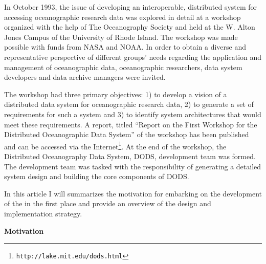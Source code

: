 In October 1993, the issue of developing an interoperable, distributed system
for accessing oceanographic research data was explored in detail at a
workshop organized with the help of The Oceanography Society and held at the
W. Alton Jones Campus of the University of Rhode Island.  The workshop was
made possible with funds from NASA and NOAA.  In order to obtain a diverse
and representative perspective of different groups' needs regarding the
application and management of oceanographic data, oceanographic researchers,
data system developers and data archive managers were invited.

The workshop had three primary objectives: 1) to develop a vision of a
distributed data system for oceanographic research data, 2) to generate a set
of requirements for such a system and 3) to identify system architectures
that would meet these requirements.  A report, titled ``Report on the First
Workshop for the Distributed Oceanographic Data System''
\cite{cornillon:dodsws1} of the workshop has been published and can be
accessed via the Internet\footnote{\tt http://lake.mit.edu/dods.html}.  At
the end of the workshop, the Distributed Oceanography Data System, DODS,
development team was formed.  The development team was tasked with the
responsibility of generating a detailed system design and building the core
components of DODS.

In this article I will summarizes the motivation for embarking on the
development of the \dods in the first place and provide an overview of the
design and implementation strategy.

\large
\bigskip
\noindent
{\bf Motivation}
\medskip
\normalsize 

